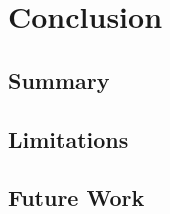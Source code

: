 \section{Conclusion}

\subsection{Summary}



\subsection{Limitations}





\subsection{Future Work}



